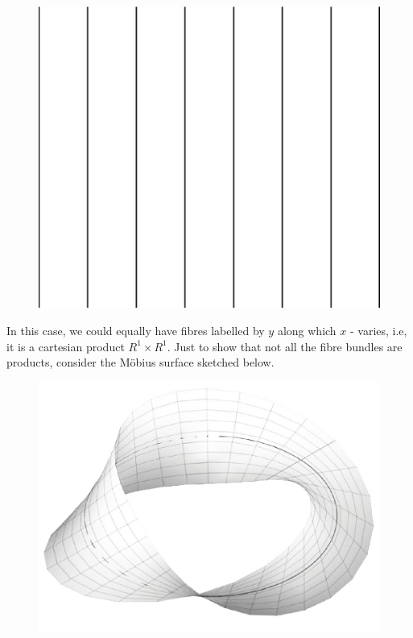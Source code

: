 \begin{figure}[H]
\centering
\includegraphics[scale=0.1]{src/images/chap26/16.jpg}
\end{figure}
\bigskip

In this case, we could equally have fibres labelled by $y$ along which $x$ - varies,
i.e, it is a cartesian product $R^1 \times R^1$. Just to show that not all the fibre bundles
are products, consider the M\"{o}bius surface sketched below.
\begin{figure}[H]
\centering
\includegraphics[scale=0.27]{src/images/chap26/17.jpg}
\end{figure}

